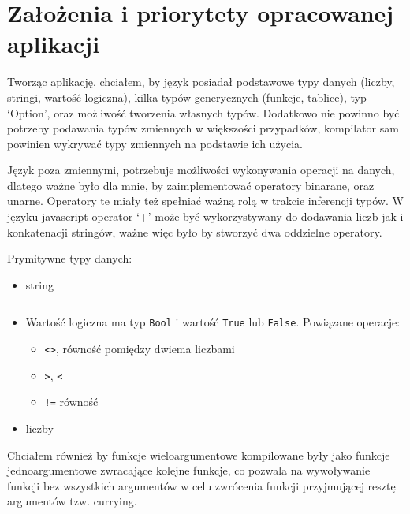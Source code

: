 \documentclass{article}
\begin{document}
\section{Założenia i priorytety opracowanej aplikacji}
Tworząc aplikację, chciałem, by język posiadał podstawowe typy danych (liczby, stringi, wartość logiczna), kilka typów generycznych (funkcje, tablice), typ `Option', oraz możliwość tworzenia własnych typów.
Dodatkowo nie powinno być potrzeby podawania typów zmiennych w większości przypadków, kompilator sam powinien wykrywać typy zmiennych na podstawie ich użycia.


Język poza zmiennymi, potrzebuje możliwości wykonywania operacji na danych, dlatego ważne było dla mnie, by zaimplementować operatory binarane, oraz unarne. Operatory te miały też spełniać ważną rolą w trakcie inferencji typów. W języku javascript operator `+' może być wykorzystywany do dodawania liczb jak i konkatenacji stringów, ważne więc było by stworzyć dwa oddzielne operatory.

Prymitywne typy danych:
\begin{itemize}
  \item string
        \inputminted{uwu.py -x}{examples/string.uwu}
  \item Wartość logiczna ma typ \texttt{Bool} i wartość \texttt{True} lub \texttt{False}.
        Powiązane operacje:
        \begin{itemize}
          \item \texttt{<>}, równość pomiędzy dwiema liczbami
          \item \texttt{>}, \texttt{<}
          \item \texttt{!=} równość
        \end{itemize}
  \item liczby
\end{itemize}


\newpage
Chciałem również by funkcje wieloargumentowe kompilowane były jako funkcje jednoargumentowe zwracające kolejne funkcje, co pozwala na wywoływanie funkcji bez wszystkich argumentów w celu zwrócenia funkcji przyjmującej resztę argumentów tzw. currying.
\end{document}
